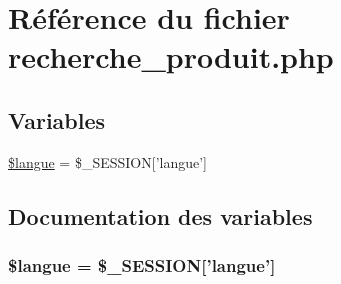 \hypertarget{recherche__produit_8php}{
\section{R\'{e}f\'{e}rence du fichier recherche\_\-produit.php}
\label{recherche__produit_8php}
}
\subsection*{Variables}
\begin{CompactItemize}
\item 
\hyperlink{recherche__produit_8php_a0}{\$langue} = \$\_\-SESSION\mbox{[}'langue'\mbox{]}
\end{CompactItemize}


\subsection{Documentation des variables}
\hypertarget{recherche__produit_8php_a0}{
\subsubsection[\$langue]{\setlength{\rightskip}{0pt plus 5cm}\$langue = \$\_\-SESSION\mbox{[}'langue'\mbox{]}}}
\label{recherche__produit_8php_a0}



